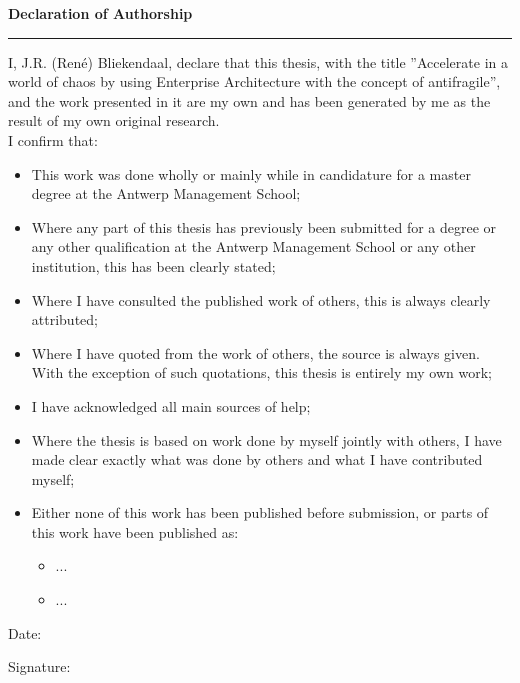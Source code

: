 
\thispagestyle{plain}
\vspace*{\fill}
\LARGE
\noindent \textbf{Declaration of Authorship}
\hrule
\normalsize
\bigskip
\noindent
I, J.R. (René) Bliekendaal, declare that this thesis, with the title ''Accelerate in a world of chaos by using Enterprise Architecture with the concept of antifragile'', and the work presented in it are my own and has been generated by me as the result of my own original research.\\

\noindent I confirm that:
\begin{itemize}
	\item{This work was done wholly or mainly while in candidature for a master degree at the Antwerp Management School;}
	\item{Where any part of this thesis has previously been submitted for a degree or any other qualification at the Antwerp Management School or any other institution, this has been clearly stated;}
	\item{Where I have consulted the published work of others, this is always clearly attributed;}
	\item{Where I have quoted from the work of others, the source is always given. With the exception of such quotations, this thesis is entirely my own work;}
	\item{I have acknowledged all main sources of help;}
	\item{Where the thesis is based on work done by myself jointly with others, I have made clear exactly what was done by others and what I have contributed myself;}
	\item{Either none of this work has been published before submission, or parts of this work have been published as:}
	\begin{itemize}
		\item{...}	
		\item{...}
	\end{itemize}
\end{itemize}
\bigskip

\noindent
Date: \makebox[2in]{\hrulefill}\\
\bigskip

\noindent Signature: \makebox[2in]{\hrulefill}\\
\vspace*{\fill}
